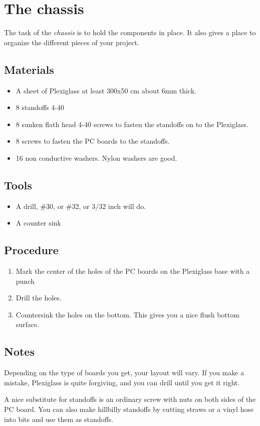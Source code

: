 \documentclass{article} \usepackage{multicol}
\begin{document}
\section{The chassis}
The task of the \textit{chassis} is to hold the components in place.
It also gives a place to organize the different pieces of your
project.

\begin{multicols}{2}

  \subsection{Materials}
  \begin{itemize}
  \item A sheet of Plexiglass at least 300x50 cm about 6mm thick.
  \item 8 standoffs 4-40
  \item 8 sunken flath head 4-40 screws to fasten the standoffs on to
    the Plexiglass.
  \item 8 screws to fasten the PC boards to the standoffs.
  \item 16 non conductive washers. Nylon washers are good.
  \end{itemize}

  \subsection{Tools}
  \begin{itemize}
  \item A drill, \#30, or \#32, or 3/32 inch will do.
  \item A counter sink
  \end{itemize}

  \subsection{Procedure}
  \begin{enumerate}
  \item Mark the center of the holes of the PC boards on the
    Plexiglass base with a punch

  \item Drill the holes.

  \item Countersink the holes on the bottom.  This gives you a nice
    flush bottom surface.
  \end{enumerate}

  \subsection{Notes}
  Depending on the type of boards you get, your layout will vary.  If
  you make a mistake, Plexiglass is quite forgiving, and you can drill
  until you get it right.

  A nice substitute for standoffs is an ordinary screw with nuts on
  both sides of the PC board.  You can also make hillbilly standoffs
  by cutting straws or a vinyl hose into bits and use them as
  standoffs.
\end{multicols}
\end{document}
